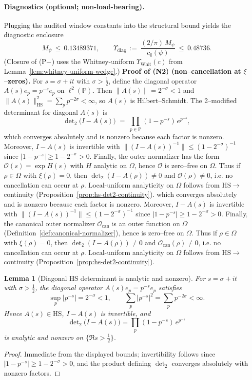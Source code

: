 \documentclass[11pt]{article}
\providecommand{\czeroplateau}{0.17620819}%
\providecommand{\CboxZeta}{K_0 + K_\xi}%
\providecommand{\CpsiHone}{0.2400}%
\providecommand{\Mpsilocked}{(4/\pi)\,\CpsiHone\,\sqrt{\CboxZeta}}
\providecommand{\UpsilonLocked}{(2/\pi)\,\Mpsilocked/\czeroplateau}%
\renewcommand{\CboxZeta}{0.19486808}
\renewcommand{\Mpsilocked}{0.13489371}
\renewcommand{\UpsilonLocked}{0.48736}
\newtheorem{lemma}[theorem]{Lemma}
\theoremstyle{definition}
\theoremstyle{remark}
\theoremstyle{definition}
\DeclareMathOperator{\dettwo}{det_2}
\begin{document}
\paragraph*{Diagnostics (optional; non-load-bearing).}
Plugging the audited window constants into the structural bound yields the diagnostic enclosure
\[
  M_\psi\ \le\ \Mpsilocked,\qquad
  \Upsilon_{\mathrm{diag}}\ :=\ \frac{(2/\pi)\,M_\psi}{c_0(\psi)}\ \le\ \UpsilonLocked.
\]
(Closure of \textup{(P+)} uses the Whitney-uniform $\Upsilon_{\mathrm{Whit}}(c)$ from Lemma~\ref{lem:whitney-uniform-wedge}.)
\fi
\medskip
\medskip
\noindent\textbf{Proof of (N2) (non--cancellation at $\xi$--zeros).}
For $s=\sigma+it$ with $\sigma>\tfrac12$, define the diagonal operator $A(s)e_p=p^{-s}e_p$ on $\ell^2(\mathbb P)$. Then $\|A(s)\|=2^{-\sigma}<1$ and $\|A(s)\|_{\mathrm{HS}}^2=\sum_{p}p^{-2\sigma}<\infty$, so $A(s)$ is Hilbert--Schmidt. The 2--modified determinant for diagonal $A(s)$ is
\[
\det\nolimits_2\!\big(I-A(s)\big)\;=\;\prod_{p\in\mathbb P}(1-p^{-s})\,e^{p^{-s}},
\]
which converges absolutely and is nonzero because each factor is nonzero. Moreover, $I-A(s)$ is invertible with $\|(I-A(s))^{-1}\|\le (1-2^{-\sigma})^{-1}$ since $|1-p^{-s}|\ge 1-2^{-\sigma}>0$. Finally, the outer normalizer has the form $\mathcal O(s)=\exp H(s)$ with $H$ analytic on $\Omega$, hence $\mathcal O$ is zero--free on $\Omega$. Thus if $\rho\in\Omega$ with $\xi(\rho)=0$, then $\det_2(I-A(\rho))\neq0$ and $\mathcal O(\rho)\neq0$, i.e. no cancellation can occur at $\rho$. Local-uniform analyticity on $\Omega$ follows from HS$\to\dettwo$ continuity (Proposition~\ref{prop:hs-det2-continuity}).
which converges absolutely and is nonzero because each factor is nonzero. Moreover, $I-A(s)$ is invertible with $\|(I-A(s))^{-1}\|\le (1-2^{-\sigma})^{-1}$ since $|1-p^{-s}|\ge 1-2^{-\sigma}>0$.
Finally, the canonical outer normalizer $\mathcal O_{\mathrm{can}}$ is an outer function on $\Omega$ (Definition~\ref{def:canonical-normalizer}), hence is zero--free on $\Omega$.
Thus if $\rho\in\Omega$ with $\xi(\rho)=0$, then $\det_2(I-A(\rho))\neq0$ and $\mathcal O_{\mathrm{can}}(\rho)\neq0$, i.e. no cancellation can occur at $\rho$.
Local-uniform analyticity on $\Omega$ follows from HS$\to\dettwo$ continuity (Proposition~\ref{prop:hs-det2-continuity}).
\begin{lemma}[Diagonal HS determinant is analytic and nonzero]\label{lem:hs-diagonal}
For $s=\sigma+it$ with $\sigma>\tfrac12$, the diagonal operator $A(s)e_p=p^{-s}e_p$ satisfies
\[
\sup_{p}|p^{-s}|=2^{-\sigma}<1,\qquad \sum_{p}|p^{-s}|^2=\sum_{p}p^{-2\sigma}<\infty.
\]
Hence $A(s)\in\mathrm{HS}$, $I-A(s)$ is invertible, and
\[
\det\nolimits_2\big(I-A(s)\big)=\prod_{p}(1-p^{-s})\,e^{p^{-s}}
\]
is analytic and nonzero on $\{\Re s>\tfrac12\}$.
\end{lemma}
\begin{proof}
Immediate from the displayed bounds; invertibility follows since $|1-p^{-s}|\ge 1-2^{-\sigma}>0$, and the product defining $\det_2$ converges absolutely with nonzero factors.
\end{proof}
\end{document}
